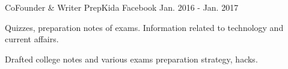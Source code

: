 

\begin{cventries}

  \cventry
    {CoFounder \& Writer} %
    {PrepKida} %
    {Facebook} %
    {Jan. 2016 - Jan. 2017} %
    {
      \begin{cvitems} %
      	\item {Quizzes, preparation notes of exams. Information related to technology and current affairs.}
        \item {Drafted college notes and various exams preparation strategy, hacks.}
      \end{cvitems}
    }


\end{cventries}
